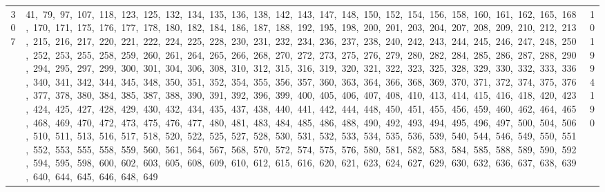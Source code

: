 \begin{longtable}{c|p{}|r}
307 & 41,\ 79,\ 97,\ 107,\ 118,\ 123,\ 125,\ 132,\ 134,\ 135,\ 136,\ 138,\ 142,\ 143,\ 147,\ 148,\ 150,\ 152,\ 154,\ 156,\ 158,\ 160,\ 161,\ 162,\ 165,\ 168,\ 170,\ 171,\ 175,\ 176,\ 177,\ 178,\ 180,\ 182,\ 184,\ 186,\ 187,\ 188,\ 192,\ 195,\ 198,\ 200,\ 201,\ 203,\ 204,\ 207,\ 208,\ 209,\ 210,\ 212,\ 213,\ 215,\ 216,\ 217,\ 220,\ 221,\ 222,\ 224,\ 225,\ 228,\ 230,\ 231,\ 232,\ 234,\ 236,\ 237,\ 238,\ 240,\ 242,\ 243,\ 244,\ 245,\ 246,\ 247,\ 248,\ 250,\ 252,\ 253,\ 255,\ 258,\ 259,\ 260,\ 261,\ 264,\ 265,\ 266,\ 268,\ 270,\ 272,\ 273,\ 275,\ 276,\ 279,\ 280,\ 282,\ 284,\ 285,\ 286,\ 287,\ 288,\ 290,\ 294,\ 295,\ 297,\ 299,\ 300,\ 301,\ 304,\ 306,\ 308,\ 310,\ 312,\ 315,\ 316,\ 319,\ 320,\ 321,\ 322,\ 323,\ 325,\ 328,\ 329,\ 330,\ 332,\ 333,\ 336,\ 340,\ 341,\ 342,\ 344,\ 345,\ 348,\ 350,\ 351,\ 352,\ 354,\ 355,\ 356,\ 357,\ 360,\ 363,\ 364,\ 366,\ 368,\ 369,\ 370,\ 371,\ 372,\ 374,\ 375,\ 376,\ 377,\ 378,\ 380,\ 384,\ 385,\ 387,\ 388,\ 390,\ 391,\ 392,\ 396,\ 399,\ 400,\ 405,\ 406,\ 407,\ 408,\ 410,\ 413,\ 414,\ 415,\ 416,\ 418,\ 420,\ 423,\ 424,\ 425,\ 427,\ 428,\ 429,\ 430,\ 432,\ 434,\ 435,\ 437,\ 438,\ 440,\ 441,\ 442,\ 444,\ 448,\ 450,\ 451,\ 455,\ 456,\ 459,\ 460,\ 462,\ 464,\ 465,\ 468,\ 469,\ 470,\ 472,\ 473,\ 475,\ 476,\ 477,\ 480,\ 481,\ 483,\ 484,\ 485,\ 486,\ 488,\ 490,\ 492,\ 493,\ 494,\ 495,\ 496,\ 497,\ 500,\ 504,\ 506,\ 510,\ 511,\ 513,\ 516,\ 517,\ 518,\ 520,\ 522,\ 525,\ 527,\ 528,\ 530,\ 531,\ 532,\ 533,\ 534,\ 535,\ 536,\ 539,\ 540,\ 544,\ 546,\ 549,\ 550,\ 551,\ 552,\ 553,\ 555,\ 558,\ 559,\ 560,\ 561,\ 564,\ 567,\ 568,\ 570,\ 572,\ 574,\ 575,\ 576,\ 580,\ 581,\ 582,\ 583,\ 584,\ 585,\ 588,\ 589,\ 590,\ 592,\ 594,\ 595,\ 598,\ 600,\ 602,\ 603,\ 605,\ 608,\ 609,\ 610,\ 612,\ 615,\ 616,\ 620,\ 621,\ 623,\ 624,\ 627,\ 629,\ 630,\ 632,\ 636,\ 637,\ 638,\ 639,\ 640,\ 644,\ 645,\ 646,\ 648,\ 649 & 101994190 \\

\end{longtable}
